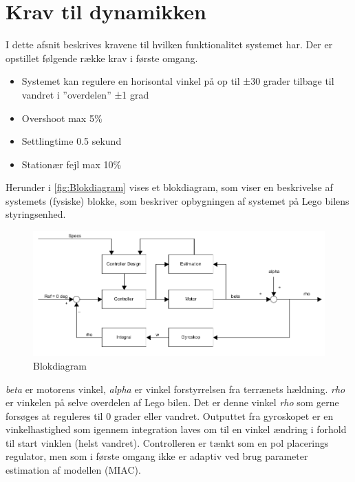 \section{Krav til dynamikken}

I dette afsnit beskrives kravene til hvilken funktionalitet systemet har. Der er opstillet følgende række krav i første omgang.
\begin{itemize}
	\item Systemet kan regulere en horisontal vinkel på op til ±30 grader tilbage til vandret i ”overdelen” ±1 grad
	\item Overshoot max 5\%
	\item Settlingtime 0.5 sekund 
	\item Stationær fejl max 10\%  
	
\end{itemize}



Herunder i \autoref{fig:Blokdiagram} vises et blokdiagram, som viser en beskrivelse af systemets (fysiske) blokke, som beskriver opbygningen af systemet på Lego bilens styringsenhed. 


\begin{figure}[H]
	\centering
	\includegraphics[width = 400 pt]{figur/blokdiagram.png}
	\caption{Blokdiagram}
	\label{fig:Blokdiagram}
\end{figure}

\textit{beta} er motorens vinkel,\textit{ alpha} er vinkel forstyrrelsen fra terrænets hældning. \textit{rho} er vinkelen på selve overdelen af Lego bilen. Det er denne vinkel \textit{rho} som gerne forsøges at reguleres til 0 grader eller vandret. Outputtet fra gyroskopet er en vinkelhastighed som igennem integration laves om til en vinkel ændring i forhold til start vinklen (helst vandret). Controlleren er tænkt som en pol placerings regulator, men som i første omgang ikke er adaptiv ved brug parameter estimation af modellen (MIAC). 